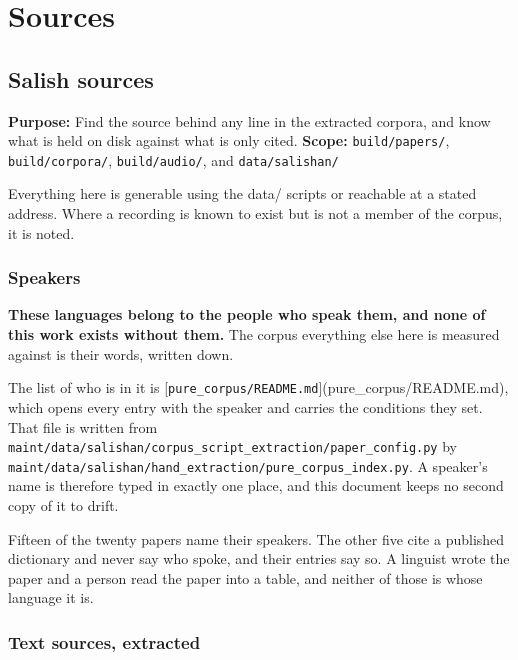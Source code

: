 \chapter{Sources}

\section{Salish sources}

\textbf{Purpose:} Find the source behind any line in the extracted corpora, and know what is held on disk against what is only cited. \textbf{Scope:} \texttt{build/\allowbreak{}papers/\allowbreak{}}, \texttt{build/\allowbreak{}corpora/\allowbreak{}}, \texttt{build/\allowbreak{}audio/\allowbreak{}}, and \texttt{data/\allowbreak{}salishan/\allowbreak{}}

Everything here is generable using the data/ scripts or reachable at a stated address. Where a recording is known to exist but is not a member of the corpus, it is noted.

\subsection{Speakers}

\textbf{These languages belong to the people who speak them, and none of this work exists without them.} The corpus everything else here is measured against is their words, written down.

The list of who is in it is [\texttt{pure\_\allowbreak{}corpus/\allowbreak{}README.\allowbreak{}md}](pure\_corpus/README.md), which opens every entry with the speaker and carries the conditions they set. That file is written from \texttt{maint/\allowbreak{}data/\allowbreak{}salishan/\allowbreak{}corpus\_\allowbreak{}script\_\allowbreak{}extraction/\allowbreak{}paper\_\allowbreak{}config.\allowbreak{}py} by \texttt{maint/\allowbreak{}data/\allowbreak{}salishan/\allowbreak{}hand\_\allowbreak{}extraction/\allowbreak{}pure\_\allowbreak{}corpus\_\allowbreak{}index.\allowbreak{}py}. A speaker's name is therefore typed in exactly one place, and this document keeps no second copy of it to drift.

Fifteen of the twenty papers name their speakers. The other five cite a published dictionary and never say who spoke, and their entries say so. A linguist wrote the paper and a person read the paper into a table, and neither of those is whose language it is.

\subsection{Text sources, extracted}


